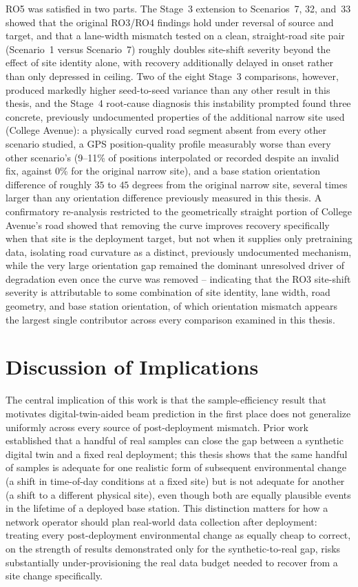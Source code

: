 \documentclass{iutbscthesis}
\begin{document}
RO5 was satisfied in two parts. The Stage~3 extension to Scenarios~7, 32, and~33 showed that the original RO3/RO4 findings hold under reversal of source and target, and that a lane-width mismatch tested on a clean, straight-road site pair (Scenario~1 versus Scenario~7) roughly doubles site-shift severity beyond the effect of site identity alone, with recovery additionally delayed in onset rather than only depressed in ceiling. Two of the eight Stage~3 comparisons, however, produced markedly higher seed-to-seed variance than any other result in this thesis, and the Stage~4 root-cause diagnosis this instability prompted found three concrete, previously undocumented properties of the additional narrow site used (College Avenue): a physically curved road segment absent from every other scenario studied, a GPS position-quality profile measurably worse than every other scenario's (9--11\% of positions interpolated or recorded despite an invalid fix, against 0\% for the original narrow site), and a base station orientation difference of roughly $35$ to $45$ degrees from the original narrow site, several times larger than any orientation difference previously measured in this thesis. A confirmatory re-analysis restricted to the geometrically straight portion of College Avenue's road showed that removing the curve improves recovery specifically when that site is the deployment target, but not when it supplies only pretraining data, isolating road curvature as a distinct, previously undocumented mechanism, while the very large orientation gap remained the dominant unresolved driver of degradation even once the curve was removed -- indicating that the RO3 site-shift severity is attributable to some combination of site identity, lane width, road geometry, and base station orientation, of which orientation mismatch appears the largest single contributor across every comparison examined in this thesis.

\section{Discussion of Implications}

The central implication of this work is that the sample-efficiency result that motivates digital-twin-aided beam prediction in the first place does not generalize uniformly across every source of post-deployment mismatch. Prior work established that a handful of real samples can close the gap between a synthetic digital twin and a fixed real deployment; this thesis shows that the same handful of samples is adequate for one realistic form of subsequent environmental change (a shift in time-of-day conditions at a fixed site) but is not adequate for another (a shift to a different physical site), even though both are equally plausible events in the lifetime of a deployed base station. This distinction matters for how a network operator should plan real-world data collection after deployment: treating every post-deployment environmental change as equally cheap to correct, on the strength of results demonstrated only for the synthetic-to-real gap, risks substantially under-provisioning the real data budget needed to recover from a site change specifically.
\end{document}
